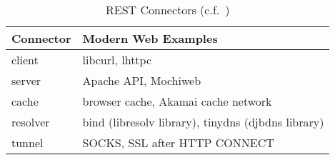 \begin{table}[h]\small
\begin{tabular}{l l}
\toprule[0.15em]
    {\bf Connector}
    &{\bf Modern Web Examples}
\\\midrule[0.15em]
    {client}
    &{libcurl, lhttpc}
\\\midrule
    {server}
    &{Apache API, Mochiweb}
\\\midrule
    {cache}
    &{browser cache, Akamai cache network}
\\\midrule
    {resolver}
    &{bind (libresolv library), tinydns (djbdns library)}
\\\midrule
    {tunnel}
    &{SOCKS, SSL after HTTP CONNECT}
\\\bottomrule[0.1em]
\end{tabular}
\centering
\caption{REST Connectors (c.f.\ \cite[p.~93]{Fie00})}
\label{REST_Connectors}
\end{table}
